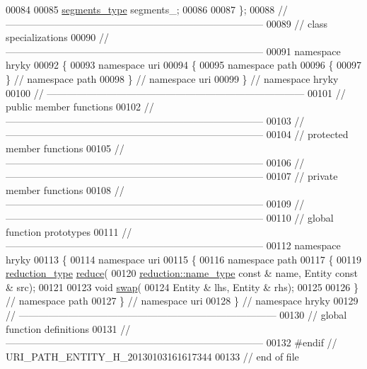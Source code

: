 \begin{DoxyCode}
00084     
00085     \hyperlink{classhryky_1_1_vector}{segments_type} segments\_;
00086 
00087 \};
00088 \textcolor{comment}{//
      ------------------------------------------------------------------------------}
00089 \textcolor{comment}{// class specializations}
00090 \textcolor{comment}{//
      ------------------------------------------------------------------------------}
00091 \textcolor{keyword}{namespace }hryky
00092 \{
00093 \textcolor{keyword}{namespace }uri
00094 \{
00095 \textcolor{keyword}{namespace }path
00096 \{
00097 \} \textcolor{comment}{// namespace path}
00098 \} \textcolor{comment}{// namespace uri}
00099 \} \textcolor{comment}{// namespace hryky}
00100 \textcolor{comment}{//
      ------------------------------------------------------------------------------}
00101 \textcolor{comment}{// public member functions}
00102 \textcolor{comment}{//
      ------------------------------------------------------------------------------}
00103 \textcolor{comment}{//
      ------------------------------------------------------------------------------}
00104 \textcolor{comment}{// protected member functions}
00105 \textcolor{comment}{//
      ------------------------------------------------------------------------------}
00106 \textcolor{comment}{//
      ------------------------------------------------------------------------------}
00107 \textcolor{comment}{// private member functions}
00108 \textcolor{comment}{//
      ------------------------------------------------------------------------------}
00109 \textcolor{comment}{//
      ------------------------------------------------------------------------------}
00110 \textcolor{comment}{// global function prototypes}
00111 \textcolor{comment}{//
      ------------------------------------------------------------------------------}
00112 \textcolor{keyword}{namespace }hryky
00113 \{
00114 \textcolor{keyword}{namespace }uri
00115 \{
00116 \textcolor{keyword}{namespace }path
00117 \{
00119     \hyperlink{namespacehryky_a343a9a4c36a586be5c2693156200eadc}{reduction_type} \hyperlink{namespacehryky_1_1uri_ab4530b241565d82fb0768bb29031858f}{reduce}(
00120         \hyperlink{namespacehryky_1_1reduction_ac686c30a4c8d196bbd0f05629a6b921f}{reduction::name_type} \textcolor{keyword}{const} & name, Entity \textcolor{keyword}{const} & src);
00121 
00123     \textcolor{keywordtype}{void} \hyperlink{namespacehryky_1_1uri_a385681623309ce37d502b7efea1bf924}{swap}(
00124         Entity & lhs, Entity & rhs);
00125 
00126 \} \textcolor{comment}{// namespace path}
00127 \} \textcolor{comment}{// namespace uri}
00128 \} \textcolor{comment}{// namespace hryky}
00129 \textcolor{comment}{//
      ------------------------------------------------------------------------------}
00130 \textcolor{comment}{// global function definitions}
00131 \textcolor{comment}{//
      ------------------------------------------------------------------------------}
00132 \textcolor{preprocessor}{#endif // URI\_PATH\_ENTITY\_H\_20130103161617344}
00133 \textcolor{preprocessor}{}\textcolor{comment}{// end of file}
\end{DoxyCode}
